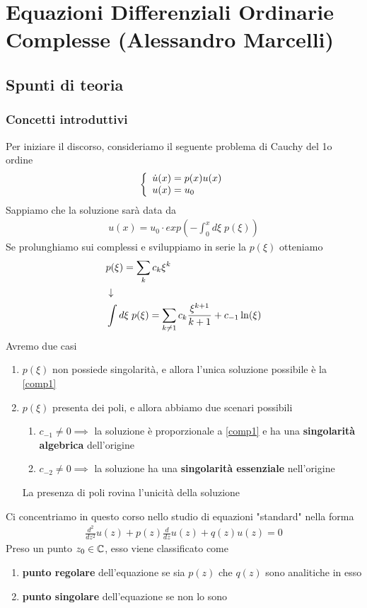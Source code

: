 \section{Equazioni Differenziali Ordinarie Complesse (Alessandro Marcelli)}

\subsection{Spunti di teoria}

\subsubsection{Concetti introduttivi}

Per iniziare il discorso, consideriamo il seguente problema di Cauchy del 1o ordine
\begin{align}
	\double{\dot{u}(x) = p(x)u(x)}{u(x) = u_0 \hfill}
\end{align}
Sappiamo che la soluzione sarà data da
\begin{align}
	u(x) = u_0 \cdot exp \left( - \int_{0}^{x} d\xi \; p(\xi) \right) \label{comp1}
\end{align}
Se prolunghiamo sui complessi e sviluppiamo in serie la $p(\xi)$ otteniamo
\begin{align}
	&p(\xi) = \sum_{k} c_k \xi^k \\ &\downarrow \nonumber \\
	&\int d\xi \; p(\xi) = \sum_{k \neq 1} c_k \frac{\xi ^{k+1}}{k+1} + c_{-1} \ln(\xi)
\end{align}
Avremo due casi
\begin{enumerate}
	\item $p(\xi)$ non possiede singolarità, e allora l'unica soluzione possibile è la \ref{comp1}
	\item $p(\xi)$ presenta dei poli, e allora abbiamo due scenari possibili
	\begin{enumerate}
		\item $c_{-1} \neq 0 \implies$ la soluzione è proporzionale a \ref{comp1} e ha una \textbf{singolarità algebrica} dell'origine
		\item $c_{-2} \neq 0 \implies$ la soluzione ha una \textbf{singolarità essenziale} nell'origine
	\end{enumerate}
	La presenza di poli rovina l'unicità della soluzione
\end{enumerate}

Ci concentriamo in questo corso nello studio di equazioni "standard" nella forma
\begin{align}
	\frac{d^2}{dz^2}u(z) + p(z) \frac{d}{dz}u(z) + q(z) u(z) = 0
\end{align}
Preso un punto $z_0 \in \mathbb{C}$, esso viene classificato come
\begin{enumerate}
	\item \textbf{punto regolare} dell'equazione se sia $p(z)$ che $q(z)$ sono analitiche in esso
	\item \textbf{punto singolare} dell'equazione se non lo sono
\end{enumerate}


